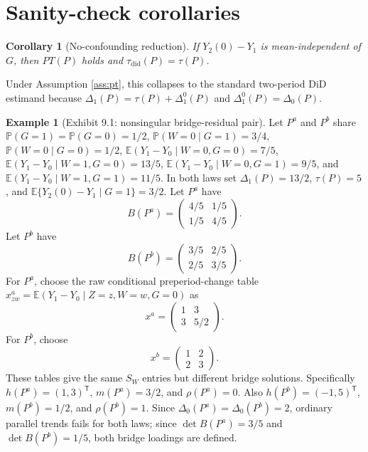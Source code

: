 \documentclass[11pt]{article}
\newcommand{\E}{\mathbb{E}}
\renewcommand{\Pr}{\mathbb{P}}
\newcommand{\transpose}{\mathsf{T}}
\theoremstyle{definition}
\newtheorem{example}{Example}
\theoremstyle{plain}
\newtheorem{corollary}{Corollary}
\theoremstyle{remark}
\begin{document}
\section{Sanity-check corollaries}
\begin{corollary}[No-confounding reduction]\label{cor:noconfound}
If \(Y_2(0)-Y_1\) is mean-independent of \(G\), then \(PT(P)\) holds and \(\tau_{\mathrm{did}}(P)=\tau(P)\).
\end{corollary}
Under Assumption \ref{ass:pt}, this collapses to the standard two-period DiD estimand because \(\Delta_1(P)=\tau(P)+\Delta^0_1(P)\) and \(\Delta^0_1(P)=\Delta_0(P)\).

\begin{example}[Exhibit 9.1: nonsingular bridge-residual pair]\label{ex:bridgepair}
Let \(P^a\) and \(P^b\) share \(\Pr(G=1)=\Pr(G=0)=1/2\), \(\Pr(W=0\mid G=1)=3/4\), \(\Pr(W=0\mid G=0)=1/2\), \(\E(Y_1-Y_0\mid W=0,G=0)=7/5\), \(\E(Y_1-Y_0\mid W=1,G=0)=13/5\), \(\E(Y_1-Y_0\mid W=0,G=1)=9/5\), and \(\E(Y_1-Y_0\mid W=1,G=1)=11/5\). In both laws set \(\Delta_1(P)=13/2\), \(\tau(P)=5\), and \(\E\{Y_2(0)-Y_1\mid G=1\}=3/2\). Let \(P^a\) have
\[
  B(P^a)=
  \begin{pmatrix}
  4/5 & 1/5\\
  1/5 & 4/5
  \end{pmatrix}.
\]
Let \(P^b\) have
\[
  B(P^b)=
  \begin{pmatrix}
  3/5 & 2/5\\
  2/5 & 3/5
  \end{pmatrix}.
\]
For \(P^a\), choose the raw conditional preperiod-change table \(x^a_{zw}=\E(Y_1-Y_0\mid Z=z,W=w,G=0)\) as
\[
  x^a=\begin{pmatrix}1&3\\3&5/2\end{pmatrix}.
\]
For \(P^b\), choose
\[
  x^b=\begin{pmatrix}1&2\\2&3\end{pmatrix}.
\]
These tables give the same \(S_W\) entries but different bridge solutions. Specifically \(h(P^a)=(1,3)^\transpose\), \(m(P^a)=3/2\), and \(\rho(P^a)=0\). Also \(h(P^b)=(-1,5)^\transpose\), \(m(P^b)=1/2\), and \(\rho(P^b)=1\). Since \(\Delta_0(P^a)=\Delta_0(P^b)=2\), ordinary parallel trends fails for both laws; since \(\det B(P^a)=3/5\) and \(\det B(P^b)=1/5\), both bridge loadings are defined.


\end{example}
\end{document}
